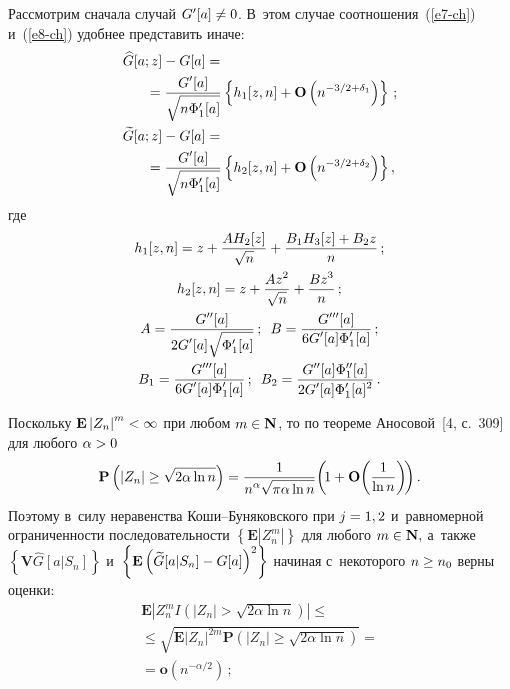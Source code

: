 \begin{multicols}{2}
  Рассмотрим сначала случай $G'[a]\hm\neq 0$. В~этом случае 
  соотношения~(\ref{e7-ch}) и~(\ref{e8-ch}) удобнее представить иначе:
 \begin{align}
  \widehat{G}[a;z]-G[a]&={}\notag\\
  &\hspace*{-15mm}{}=\fr{G'[a]}{\sqrt {n\Phi'_1 [a] }} \left\{
  h_1[z,n] + \mathbf{O}\left( {n^{- 3/2+\delta_1} } \right) \right\}\,;
\label{e12-ch}
 \\ 
 \widetilde{G}[a;z]-G[a]&= {}\notag\\
&\hspace*{-15mm}{}= \fr{G'[a]}{\sqrt {n\Phi '_1 [a]} }
    \left\{ h_2[z,n] + \mathbf{O}\left(n^{ - 3/2+\delta_2}\right)
  \right\}, \notag %
  \end{align}
 где
 \begin{gather*}
h_1[z,n]= z
 + \displaystyle\frac{\displaystyle A H_2[z]\mathstrut}{\displaystyle \sqrt{n}\mathstrut}  + \displaystyle\frac{\displaystyle B_1 H_3[z]+B_2 z\mathstrut}{\displaystyle n\mathstrut}\,;
 \notag \\
h_2[z,n]= z + \displaystyle\frac{\displaystyle A z^2\mathstrut}{\displaystyle \sqrt {n }\mathstrut} + \displaystyle\frac{\displaystyle B z^3\mathstrut}{\displaystyle n\mathstrut}\,;\\
  A = \displaystyle\frac{\displaystyle G''[a]\mathstrut}{\displaystyle 2 G'[a]\sqrt {\Phi'_1[a]} \mathstrut}\,;\enskip
 B = \displaystyle\frac{\displaystyle G'''[a]\mathstrut}{\displaystyle 6 G'[a]\Phi'_1[a]\mathstrut}\,;
 \label{e14-ch}\\
B_1  = \displaystyle\frac{\displaystyle G'''[a]\mathstrut}{\displaystyle 6 G'[a]\Phi '_1[a]\mathstrut}\,;\enskip
 B_2  = \displaystyle\frac{\displaystyle G''[a]\Phi ''_1 [a]\mathstrut}{\displaystyle 2 G'[a]\Phi'_1[a]^2 \mathstrut}\,.
 \end{gather*}

 Поскольку $\mathbf{E}\left|Z_n\right|^m\hm<\infty$ при любом $m\hm\in \mathbf{N}$,
 то по теореме Аносовой~[4, с.~309] для любого $\alpha\hm>0$
 \begin{equation*}
 \mathbf{P}\left( \left| {Z_n } \right| \ge \sqrt {2\alpha \ln n} \right)
 = \displaystyle\frac{\displaystyle 1\mathstrut}{\displaystyle n^\alpha \sqrt{\pi\alpha\ln n}\mathstrut}
\! \left(\!1+\mathbf{O}\!\left( \displaystyle\frac{\displaystyle 1\mathstrut}{\displaystyle \ln n\mathstrut} \right)\!\right).
 \end{equation*}
 Поэтому в~силу неравенства Ко\-ши--Бу\-ня\-ков\-ско\-го при $j\hm=1,2$ и~равномерной 
 ограниченности последовательности $\left\{\mathbf{E} |Z_n^m|\right\}$
 для любого $m\hm\in \mathbf{N},$ а~также
 $\left\{\mathbf{V} \widehat{G}[a|S_n]\right\}$ 
 и~$\left\{\mathbf{E} \left(\widetilde{G}[a|S_n]\hm-G[a]\right)^2\right\}$
 начиная с~некоторого $n\hm\ge n_0$ верны оценки:
 \begin{multline}
 \mathbf{E}\left| Z_n^m  I\left( \left| {Z_n } \right| > 
 \sqrt {2\alpha \ln n} \right)\right|\le{}
 \\ 
 \le \sqrt{\mathbf{E}\left|Z_n\right|^{2m}
 \mathbf{P}\left( \left| {Z_n } \right| \ge \sqrt {2\alpha \ln n} \right)}
 ={}\\
 {}= \mathbf{o}\left(n^{-\alpha/2}\right)\,;
 \label{e16-ch}
 \end{multline}
 

\end{multicols}
